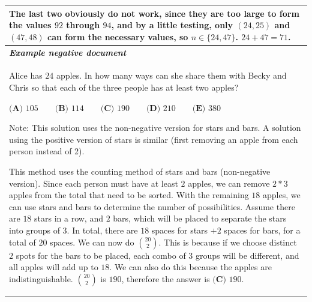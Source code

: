 \begin{table}[ht]
\begin{tabular}{p{13cm}}
The last two obviously do not work, since they are too large to form the values $92$ through $94$, and by a little testing, only $(24, 25)$ and $(47, 48)$ can form the necessary values, so $n \in \{24, 47\}$. $24 + 47 = \boxed{71}$.\\
\midrule
\textit{\textbf{Example negative document}} \\
\midrule
Alice has $24$ apples. In how many ways can she share them with Becky and Chris so that each of the three people has at least two apples?

$\textbf{(A) }105\qquad\textbf{(B) }114\qquad\textbf{(C) }190\qquad\textbf{(D) }210\qquad\textbf{(E) }380$

Note: This solution uses the non-negative version for stars and bars. A solution using the positive version of stars is similar (first removing an apple from each person instead of 2).

This method uses the counting method of stars and bars (non-negative version). Since each person must have at least $2$ apples, we can remove $2*3$ apples from the total that need to be sorted. With the remaining $18$ apples, we can use stars and bars to determine the number of possibilities. Assume there are $18$ stars in a row, and $2$ bars, which will be placed to separate the stars into groups of $3$. In total, there are $18$ spaces for stars $+ 2$ spaces for bars, for a total of $20$ spaces. We can now do $20 \choose 2$. This is because if we choose distinct $2$ spots for the bars to be placed, each combo of $3$ groups will be different, and all apples will add up to $18$. We can also do this because the apples are indistinguishable. $20 \choose 2$ is $190$, therefore the answer is $\boxed{\textbf{(C) }190}$. 
\\
\bottomrule
\end{tabular}
\label{tab:example_math}
\end{table}